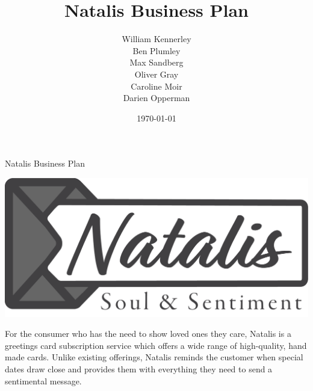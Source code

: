 \documentclass[10pt,a4paper]{article}
\title{Natalis Business Plan}
\author{William Kennerley\\
Ben Plumley\\
Max Sandberg\\
Oliver Gray\\
Caroline Moir\\
Darien Opperman}
\date{\today}
\begin{document}
\begin{titlepage} %

	\centering %

	\scshape %

	\vspace*{\baselineskip} %




	\vspace{0.75\baselineskip} %

	{\Huge Natalis Business Plan} %

	\vspace{0.75\baselineskip} %



	\vspace{2\baselineskip} %

	\includegraphics[width=\linewidth/2]{logo.png}

		\vspace{3\baselineskip} %


For the consumer who has the need to show loved ones they care, Natalis is a greetings card subscription service which offers a wide range of high-quality, hand made cards. Unlike existing offerings, Natalis reminds the customer when special dates draw close and provides them with everything they need to send a sentimental message.

	\vspace*{3\baselineskip} %


\end{titlepage}
\end{document}
